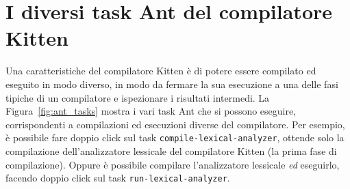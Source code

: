 \section{I diversi task Ant del compilatore Kitten}\label{sec:kitten_compilations}
%
Una caratteristiche del compilatore Kitten \`e di potere essere compilato ed
eseguito in modo diverso, in modo da fermare la sua esecuzione a una delle
fasi tipiche di un compilatore e ispezionare i risultati intermedi.
La Figura~\ref{fig:ant_tasks} mostra i vari task Ant che si possono eseguire,
corrispondenti a compilazioni ed esecuzioni diverse del compilatore.
Per esempio, \`e possibile fare doppio click sul task
\texttt{compile-lexical-analyzer}, ottende solo la compilazione dell'analizzatore
lessicale del compilatore Kitten (la prima fase di compilazione). Oppure \`e
possibile compilare l'analizzatore lessicale \emph{ed} eseguirlo, facendo
doppio click sul task \texttt{run-lexical-analyzer}.

